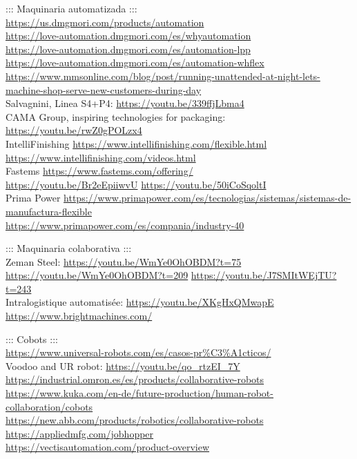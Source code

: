 \documentclass[spanish,12pt,a4paper,final,oneside]{book}
\begin{document}
::: Maquinaria automatizada :::
\\ \url{https://us.dmgmori.com/products/automation}
\\ \url{https://love-automation.dmgmori.com/es/whyautomation}
\\ \url{https://love-automation.dmgmori.com/es/automation-lpp}
\\ \url{https://love-automation.dmgmori.com/es/automation-whflex}
\\ {\footnotesize \url{https://www.mmsonline.com/blog/post/running-unattended-at-night-lets-machine-shop-serve-new-customers-during-day}}
\\Salvagnini, Linea S4+P4: \url{https://youtu.be/339ffjLbma4}
\\CAMA Group, inspiring technologies for packaging: \url{https://youtu.be/rwZ0gPOLzx4}
\\IntelliFinishing \url{https://www.intellifinishing.com/flexible.html}
\\ \url{https://www.intellifinishing.com/videos.html}
\\Fastems \url{https://www.fastems.com/offering/}
\\ \url{https://youtu.be/Br2eEpiiwvU} \hspace{0.3cm} \url{https://youtu.be/50iCoSqoltI}
\\ Prima Power \url{https://www.primapower.com/es/tecnologias/sistemas/sistemas-de-manufactura-flexible}
\\ \url{https://www.primapower.com/es/compania/industry-40}

::: Maquinaria colaborativa :::
\\Zeman Steel: \url{https://youtu.be/WmYe0OhOBDM?t=75} \hspace{0.3cm} \url{https://youtu.be/WmYe0OhOBDM?t=209} \hspace{0.3cm} \url{https://youtu.be/J7SMItWEjTU?t=243}
\\Intralogistique automatisée: \url{https://youtu.be/XKgHxQMwapE}
\\ \url{https://www.brightmachines.com/}

::: Cobots :::
\\ \url{https://www.universal-robots.com/es/casos-pr%C3%A1cticos/}
\\ Voodoo and UR robot: \url{https://youtu.be/qo_rtzEI_7Y}
\\ \url{https://industrial.omron.es/es/products/collaborative-robots}
\\ \url{https://www.kuka.com/en-de/future-production/human-robot-collaboration/cobots}
\\ \url{https://new.abb.com/products/robotics/collaborative-robots}
\\ \url{https://appliedmfg.com/jobhopper}
\\ \url{https://vectisautomation.com/product-overview}
\end{document}
